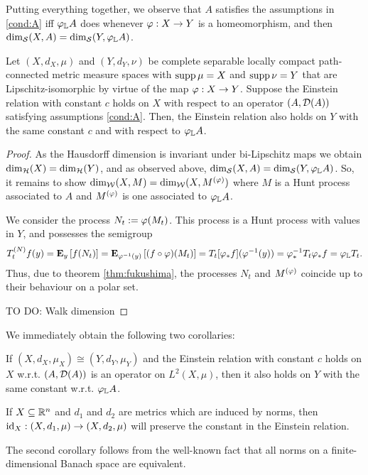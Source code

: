 Putting everything together, we observe that $A$ satisfies the assumptions in \ref{cond:A} iff $\gp_\IL A$ does whenever $\gp:X\to Y$ is a homeomorphism, and then $\dims(X,A)=\dims(Y,\gp_\IL A)$.

\begin{prop}\label{prop:mmiso}
  Let $(X,d_X,\mu)$ and $(Y,d_Y,\nu)$ be complete separable locally compact path-connected metric measure spaces with $\supp\mu=X$ and $\supp\nu=Y$ that are Lipschitz-isomorphic by virtue of the map $\gp:X\to Y$. Suppose the Einstein relation with constant $c$ holds on $X$ with respect to an operator $(A,\cD(A))$ satisfying assumptions \ref{cond:A}. Then, the Einstein relation also holds on $Y$ with the same constant $c$ and with respect to $\gp_{\IL} A$.
\end{prop}
\begin{proof}
  As the Hausdorff dimension is invariant under bi-Lipschitz maps we obtain $\dimh(X)=\dimh(Y)$, and as observed above, $\dims(X,A)=\dims(Y,\gp_{\IL} A)$. So, it remains to show $\dimw(X,M)=\dimw(X,M^{(\gp)})$ where $M$ is a Hunt process associated to $A$ and $M^{(\gp)}$ is one associated to $\gp_{\IL} A$. 
  
  We consider the process $N_t:=\gp(M_t)$. This process is a Hunt process with values in $Y$, and possesses the semigroup
  \[
    T_t^{(N)}f(y)
    =\PTEp{f(N_t)}{y}
    =\PTEp{(f\circ\gp)(M_t)}{\gp^{-1}(y)}
    =T_t[\gp_*f](\gp^{-1}(y))
    =\gp_*^{-1}T_t\gp_* f
    =\gp_{\IL} T_t.
  \]
  Thus, due to theorem \ref{thm:fukushima}, the processes $N_t$ and $M^{(\gp)}$ coincide up to their behaviour on a polar set.  
  
  TO DO: Walk dimension
\end{proof}
We immediately obtain the following two corollaries:
\begin{cor}
  If $(X,d_X,\mu_X)\cong(Y,d_Y,\mu_Y)$ and the Einstein relation with constant $c$ holds on $X$ w.r.t. $(A,\cD(A))$ is an operator on $L^2(X,\mu)$, then it also holds on $Y$ with the same constant w.r.t. $\gp_{\IL}A$. 
\end{cor}
\begin{cor}
  If $X\ssq\IR^n$ and $d_1$ and $d_2$ are metrics which are induced by norms, then $\id_X:(X,d_1,\mu)\to(X,d_2,\mu)$ will preserve the constant in the Einstein relation.
\end{cor}
The second corollary follows from the well-known fact that all norms on a finite-dimensional Banach space are equivalent. 





